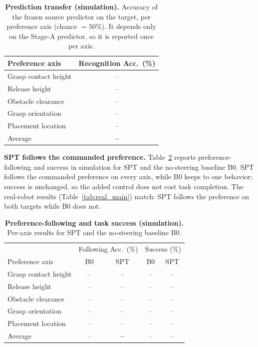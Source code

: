 \begin{table}[t]
  \centering
  \small
  \caption{\textbf{Prediction transfer (simulation).} Accuracy of the frozen
  source predictor on the target, per preference axis (chance $=50\%$). It
  depends only on the Stage-A predictor, so it is reported once per axis.}
  \label{tab:sim_recognition}
  \begin{tabular}{lc}
    \hline
    Preference axis & Recognition Acc.\ (\%) \\
    \hline
    Grasp contact height & -- \\
    Release height       & -- \\
    Obstacle clearance   & -- \\
    Grasp orientation    & -- \\
    Placement location   & -- \\
    \hline
    Average              & \textbf{--} \\
    \hline
  \end{tabular}
\end{table}

\textbf{SPT follows the commanded preference.}
Table~\ref{tab:sim_main} reports preference-following and success in simulation
for SPT and the no-steering baseline B0. SPT follows the commanded preference on
every axis, while B0 keeps to one behavior; success is unchanged, so the added
control does not cost task completion. The real-robot results
(Table~\ref{tab:real_main}) match: SPT follows the preference on both targets
while B0 does not.

\begin{table}[t]
  \centering
  \small
  \caption{\textbf{Preference-following and task success (simulation).} Per-axis
  results for SPT and the no-steering baseline B0.}
  \label{tab:sim_main}
  \begin{tabular}{lcccc}
    \hline
    & \multicolumn{2}{c}{Following Acc.\ (\%)} & \multicolumn{2}{c}{Success (\%)} \\
    Preference axis & B0 & SPT & B0 & SPT \\
    \hline
    Grasp contact height & -- & -- & -- & -- \\
    Release height       & -- & -- & -- & -- \\
    Obstacle clearance   & -- & -- & -- & -- \\
    Grasp orientation    & -- & -- & -- & -- \\
    Placement location   & -- & -- & -- & -- \\
    \hline
    Average              & -- & \textbf{--} & -- & -- \\
    \hline
  \end{tabular}
\end{table}


